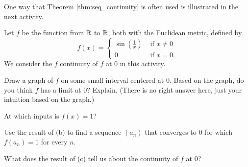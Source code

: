 One way that Theorem \ref{thm:seq_continuity} is often used is illustrated in the next activity. 

\begin{activity} \label{act:sequence_continuity} Let $f$ be the function from $\mathbb{R}$ to $\mathbb{R}$, both with the Euclidean metric, defined by 
\[f(x) = \begin{cases} \sin\left(\frac{1}{x}\right) &\text{ if } x \neq 0 \\ 0 &\text{ if } x = 0. \end{cases}\]
We consider the $f$ continuity of $f$ at $0$ in this activity.

	\ba
	\item Draw a graph of $f$ on some small interval centered at $0$. Based on the  graph, do you think $f$ has a limit at $0$? Explain. (There is no right answer here, just your intuition based on the graph.)
	
	\item At which inputs is $f(x)=1$? 
	
	\item Use the result of (b) to find a sequence $(a_n)$ that converges to $0$ for which $f(a_n) = 1$ for every $n$.
	
	\item What does the result of (c) tell us about the continuity of $f$ at $0$? 
	

	\ea

\end{activity}

\begin{comment}

\ActivitySolution

\ba

\item A graph of $f$ on the interval $[-1,1]$ is shown in Figure \ref{F:top_sine}. Based on the appearance of the graph, it looks as though the graph oscillates back and forth infinitely often between $-1$ and $1$ as $x$ gets close to $0$. So we don't expect the function $f$ to have a limit at $0$.  
\begin{figure}[h]
\begin{center}
\resizebox{!}{2.0in}{\texttt{[image: topologist\_sine]}}
\caption{A graph of $f(x)$.} 
\label{F:top_sine}
\end{center}
\end{figure}

\item We will have $f(x) = 1$ when $\sin\left(\frac{1}{x}\right) = 1$. This happens when $\frac{1}{x} = \frac{\pi}{2} + k \pi$ for any integer $k$, or when 
\[x = \frac{1}{\frac{\pi}{2} + k \pi}.\]

\item Let $a_n = \frac{1}{\frac{\pi}{2} + n \pi}$. As $n$ goes to infinity, $a_n$ converges to $0$. But $f(a_n) = 1$ for every $n$. This means that if $f$ has a limit at $0$, that limit has to be $1$. But $f(0) = 0$, so $f$ is not continuous at $0$. 

\ea

\end{comment}

